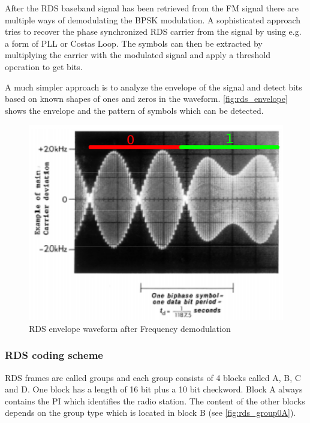After the \ac{RDS} baseband signal has been retrieved from the \ac{FM} signal
there are multiple ways of demodulating the \ac{BPSK} modulation. A sophisticated
approach tries to recover the phase synchronized \ac{RDS} carrier from the
signal by using e.g. a form of \ac{PLL} or Costas Loop. The symbols can then
be extracted by multiplying the carrier with the modulated signal and apply
a threshold operation to get bits.

A much simpler approach is to analyze the envelope of the signal and detect
bits based on known shapes of ones and zeros in the waveform.
\autoref{fig:rds_envelope} shows the envelope and the pattern of symbols
which can be detected.

\begin{figure}
	\centering
	\includegraphics[width=1\linewidth]{gfx/rds/rds_waveform.png}
	\caption[RDS envelope waveform after Frequency demodulation]{RDS envelope waveform after Frequency demodulation \cite{1999:iec62106}}
	\label{fig:rds_envelope}
\end{figure}



\subsubsection{RDS coding scheme}

RDS frames are called groups and each group consists of 4 blocks called
A, B, C and D. One block has a length of 16 bit plus a 10 bit checkword.
Block A always contains the \ac{PI} which identifies the radio station.
The content of the other blocks depends on the group type which is located
in block B (see \autoref{fig:rds_group0A}).

